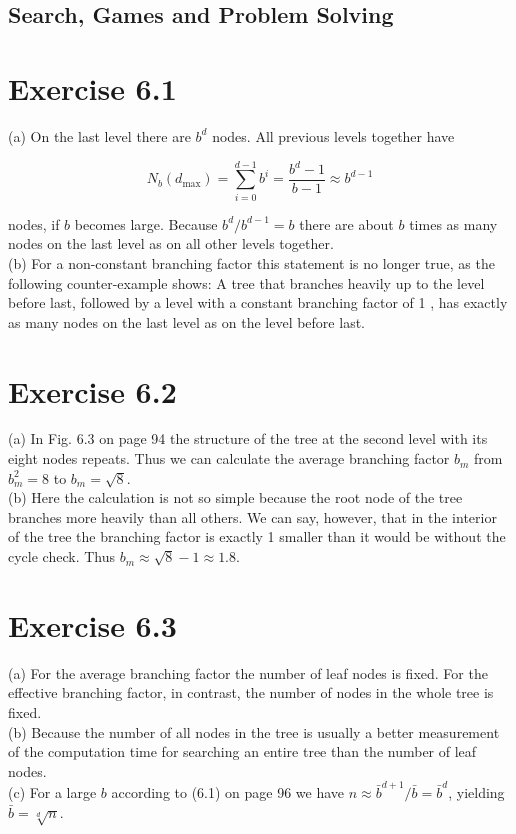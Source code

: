 \documentclass[10pt]{article}
\begin{document}
\subsection*{Search, Games and Problem Solving}
\section*{Exercise 6.1}
(a) On the last level there are $b^{d}$ nodes. All previous levels together have

$$
N_{b}\left(d_{\max }\right)=\sum_{i=0}^{d-1} b^{i}=\frac{b^{d}-1}{b-1} \approx b^{d-1}
$$

nodes, if $b$ becomes large. Because $b^{d} / b^{d-1}=b$ there are about $b$ times as many nodes on the last level as on all other levels together.\\
(b) For a non-constant branching factor this statement is no longer true, as the following counter-example shows: A tree that branches heavily up to the level before last, followed by a level with a constant branching factor of 1 , has exactly as many nodes on the last level as on the level before last.

\section*{Exercise 6.2}
(a) In Fig. 6.3 on page 94 the structure of the tree at the second level with its eight nodes repeats. Thus we can calculate the average branching factor $b_{m}$ from $b_{m}^{2}=8$ to $b_{m}=\sqrt{8}$.\\
(b) Here the calculation is not so simple because the root node of the tree branches more heavily than all others. We can say, however, that in the interior of the tree the branching factor is exactly 1 smaller than it would be without the cycle check. Thus $b_{m} \approx \sqrt{8}-1 \approx 1.8$.

\section*{Exercise 6.3}
(a) For the average branching factor the number of leaf nodes is fixed. For the effective branching factor, in contrast, the number of nodes in the whole tree is fixed.\\
(b) Because the number of all nodes in the tree is usually a better measurement of the computation time for searching an entire tree than the number of leaf nodes.\\
(c) For a large $b$ according to (6.1) on page 96 we have $n \approx \bar{b}^{d+1} / \bar{b}=\bar{b}^{d}$, yielding $\bar{b}=\sqrt[d]{n}$.
\end{document}
